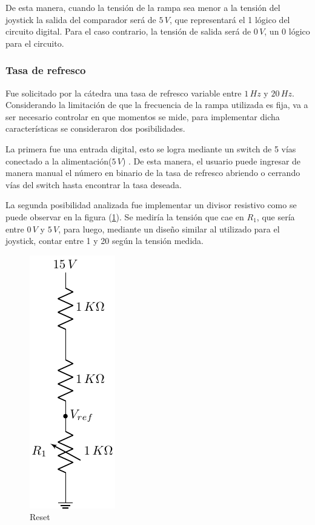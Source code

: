 De esta manera, cuando la tensión de la rampa sea menor a la tensión del joystick la salida del comparador será de $5\,V$, que representará el 1 lógico del circuito digital. Para el caso contrario, la tensión de salida será de $0\,V$, un 0 lógico para el circuito.

\subsubsection{Tasa de refresco}

Fue solicitado por la cátedra una tasa de refresco variable entre $1\,Hz$ y $20\,Hz$. Considerando la limitación de que la frecuencia de la rampa utilizada es fija, va a ser necesario controlar en que momentos se mide, para implementar dicha características se consideraron dos posibilidades. \par

La primera fue una entrada digital, esto se logra mediante un switch de 5 vías conectado a la alimentación($5\,V$) . De esta manera, el usuario puede ingresar de manera manual el número en binario de la tasa de refresco abriendo o cerrando vías del switch hasta encontrar la tasa deseada.
\par

La segunda posibilidad analizada fue implementar un divisor resistivo como se puede observar en la figura (\ref{fig:Divisor}). Se mediría la tensión que cae en $R_1$, que sería entre $0\,V$ y $5\,V$, para luego, mediante un diseño similar al utilizado para el joystick, contar entre 1 y 20 según la tensión medida.

\begin{figure}[H]
\centering
\includegraphics[scale=0.6]{Ejercicio8/Circuitos/Divisor.pdf}
\caption{Reset}
\label{fig:Divisor}
\end{figure}

